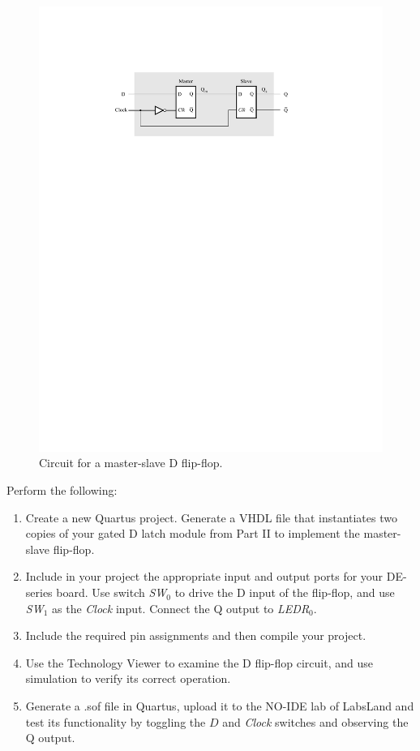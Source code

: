 \documentclass[epsfig,10pt,fullpage]{article}
\begin{document}
\begin{figure}[H]
	\begin{center}
		\includegraphics[]{figures/figure5.pdf}
	\end{center}
	\caption{Circuit for a master-slave D flip-flop.}
\label{fig:MS_FF}
\end{figure}

Perform the following:
\begin{enumerate}
\item Create a new Quartus project. Generate a VHDL file that instantiates two
copies of your gated D latch module from Part II to implement the master-slave flip-flop.
\item Include in your project the appropriate input and output ports for your 
DE-series board. Use switch {\it SW}$_0$ to drive the D input of the flip-flop,
and use {\it SW}$_1$ as the {\it Clock} input. Connect the Q output to {\it LEDR}$_{0}$.
\item
Include the required pin assignments and then compile your project.
\item Use the Technology Viewer to examine the D flip-flop circuit, and use
simulation to verify its correct operation.
\item
Generate a .sof file in Quartus, upload it to the NO-IDE lab of LabsLand and test its functionality 
by toggling the $D$ and {\it Clock} switches and observing the Q output.
\end{enumerate}
\end{document}
